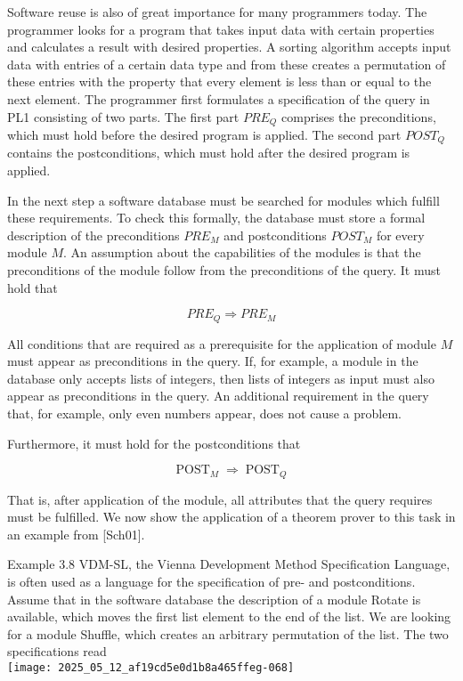 \documentclass[10pt]{article}
\begin{document}
Software reuse is also of great importance for many programmers today. The programmer looks for a program that takes input data with certain properties and calculates a result with desired properties. A sorting algorithm accepts input data with entries of a certain data type and from these creates a permutation of these entries with the property that every element is less than or equal to the next element. The programmer first formulates a specification of the query in PL1 consisting of two parts. The first part $P R E_{Q}$ comprises the preconditions, which must hold before the desired program is applied. The second part $P O S T_{Q}$ contains the postconditions, which must hold after the desired program is applied.

In the next step a software database must be searched for modules which fulfill these requirements. To check this formally, the database must store a formal description of the preconditions $P R E_{M}$ and postconditions $P O S T_{M}$ for every module $M$. An assumption about the capabilities of the modules is that the preconditions of the module follow from the preconditions of the query. It must hold that

$$
P R E_{Q} \Rightarrow P R E_{M}
$$

All conditions that are required as a prerequisite for the application of module $M$ must appear as preconditions in the query. If, for example, a module in the database only accepts lists of integers, then lists of integers as input must also appear as preconditions in the query. An additional requirement in the query that, for example, only even numbers appear, does not cause a problem.

Furthermore, it must hold for the postconditions that

$$
\operatorname{POST}_{M} \Rightarrow \operatorname{POST}_{Q}
$$

That is, after application of the module, all attributes that the query requires must be fulfilled. We now show the application of a theorem prover to this task in an example from [Sch01].

Example 3.8 VDM-SL, the Vienna Development Method Specification Language, is often used as a language for the specification of pre- and postconditions. Assume that in the software database the description of a module Rotate is available, which moves the first list element to the end of the list. We are looking for a module Shuffle, which creates an arbitrary permutation of the list. The two specifications read\\
\texttt{[image: 2025\_05\_12\_af19cd5e0d1b8a465ffeg-068]}
\end{document}

